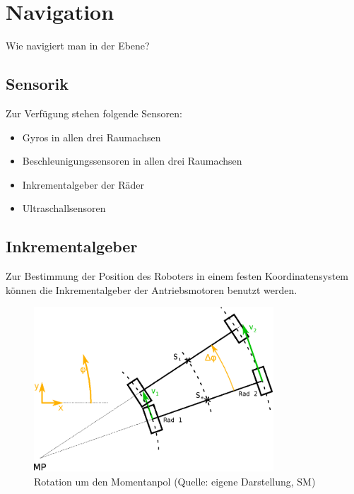 \renewcommand{\autoren}{Stephan Morongowski}
\newpage
\section{Navigation}

Wie navigiert man in der Ebene?

\subsection{Sensorik}
Zur Verfügung stehen folgende Sensoren:
\begin{itemize}
\item Gyros in allen drei Raumachsen
\item Beschleunigungssensoren in allen drei Raumachsen
\item Inkrementalgeber der Räder
\item Ultraschallsensoren
\end{itemize}

\subsection{Inkrementalgeber}

Zur Bestimmung der Position des Roboters in einem festen Koordinatensystem können die Inkrementalgeber der Antriebsmotoren benutzt werden.

\begin{figure}[h]  %
\centering\includegraphics[width=0.8\textwidth]{images/Kurvenkinematic.eps}
\caption{Rotation um den Momentanpol \newline (Quelle: eigene Darstellung, SM)}
\label{kurvenkinematik}
\end{figure}

